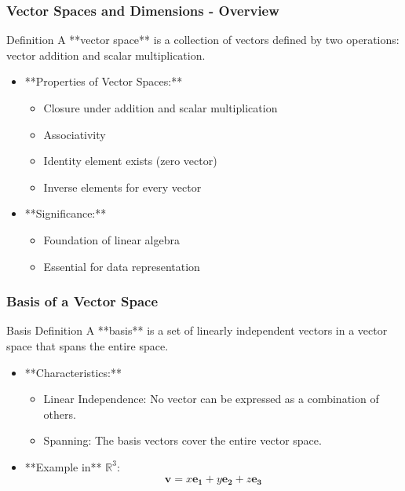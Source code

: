 \documentclass{beamer}
\begin{document}
\begin{frame}[fragile]
    \frametitle{Vector Spaces and Dimensions - Overview}
    \begin{block}{Definition}
        A **vector space** is a collection of vectors defined by two operations: vector addition and scalar multiplication.
    \end{block}
    \begin{itemize}
        \item **Properties of Vector Spaces:**
            \begin{itemize}
                \item Closure under addition and scalar multiplication
                \item Associativity
                \item Identity element exists (zero vector)
                \item Inverse elements for every vector
            \end{itemize}
        \item **Significance:**
            \begin{itemize}
                \item Foundation of linear algebra 
                \item Essential for data representation
            \end{itemize}
    \end{itemize}
\end{frame}

\begin{frame}[fragile]
    \frametitle{Basis of a Vector Space}
    \begin{block}{Basis Definition}
        A **basis** is a set of linearly independent vectors in a vector space that spans the entire space.
    \end{block}
    \begin{itemize}
        \item **Characteristics:**
            \begin{itemize}
                \item Linear Independence: No vector can be expressed as a combination of others.
                \item Spanning: The basis vectors cover the entire vector space.
            \end{itemize}
        \item **Example in** \( \mathbb{R}^3 \):
            \begin{equation}
                \mathbf{v} = x\mathbf{e_1} + y\mathbf{e_2} + z\mathbf{e_3}
            \end{equation}
    \end{itemize}
\end{frame}
\end{document}
